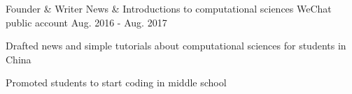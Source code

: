 \begin{cventries}
  \cventry
    {Founder \& Writer}
    {News \& Introductions to computational sciences}
    {WeChat public account}
    {Aug. 2016 - Aug. 2017}
    {
      \begin{cvitems}
        \item {Drafted news and simple tutorials about computational sciences for students in China}
        \item {Promoted students to start coding in middle school}
      \end{cvitems}
    }
\end{cventries}
